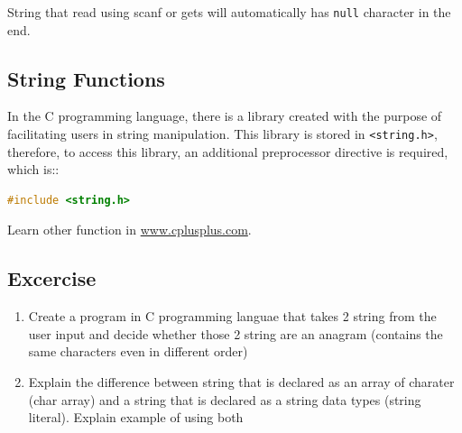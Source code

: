 String that read using scanf or gets will automatically has \verb|null| character in the end.
\subsection{String Functions}

In the C programming language, there is a library created with the purpose of facilitating users in string manipulation. This library is stored in \verb|<string.h>|,
therefore, to access this library, an additional preprocessor directive is required, which is::
\begin{lstlisting}[language=c]
	#include <string.h>
\end{lstlisting}
	
Learn other function in \href{http://www.cplusplus.com/}{www.cplusplus.com}.

\subsection{Excercise}
\begin{enumerate}
	\item Create a program in C programming languae that takes 2 string from the user input and decide whether those 2 string are an anagram (contains the same characters even in different order)
	\item Explain the difference between string that is declared as an array of charater (char array) and a string that is declared as a string data types (string literal). Explain example of using both 
\end{enumerate}